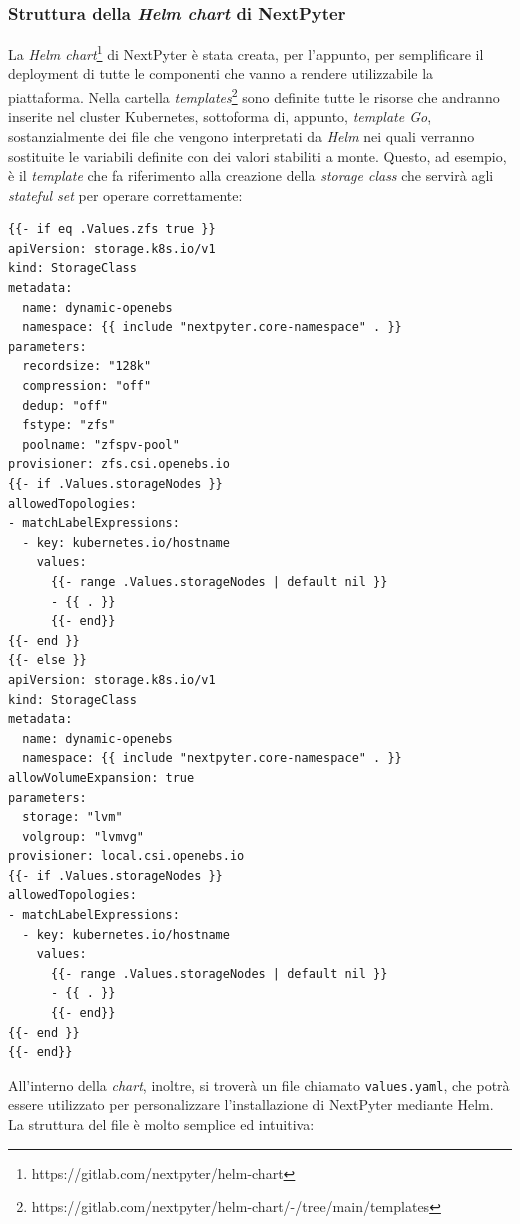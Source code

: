 \subsubsection{Struttura della \textit{Helm chart} di NextPyter}
La \textit{Helm chart}\footnote{https://gitlab.com/nextpyter/helm-chart} di NextPyter è stata creata, per l'appunto, per semplificare il deployment di tutte le componenti che vanno a rendere utilizzabile la piattaforma.
\newline
Nella cartella \textit{templates}\footnote{https://gitlab.com/nextpyter/helm-chart/-/tree/main/templates} sono definite tutte le risorse che andranno inserite nel cluster Kubernetes, sottoforma di, appunto, \textit{template Go}, sostanzialmente dei file che vengono interpretati da \textit{Helm} nei quali verranno sostituite le variabili definite con dei valori stabiliti a monte.
\newline
Questo, ad esempio, è il \textit{template} che fa riferimento alla creazione della \textit{storage class} che servirà agli \textit{stateful set} per operare correttamente:
\newpage
\begin{verbatim}   
{{- if eq .Values.zfs true }}
apiVersion: storage.k8s.io/v1
kind: StorageClass
metadata:
  name: dynamic-openebs
  namespace: {{ include "nextpyter.core-namespace" . }}
parameters:
  recordsize: "128k"
  compression: "off"
  dedup: "off"
  fstype: "zfs"
  poolname: "zfspv-pool"
provisioner: zfs.csi.openebs.io
{{- if .Values.storageNodes }}
allowedTopologies:
- matchLabelExpressions:
  - key: kubernetes.io/hostname
    values: 
      {{- range .Values.storageNodes | default nil }}
      - {{ . }}
      {{- end}}
{{- end }}
{{- else }}
apiVersion: storage.k8s.io/v1
kind: StorageClass
metadata:
  name: dynamic-openebs
  namespace: {{ include "nextpyter.core-namespace" . }}
allowVolumeExpansion: true
parameters:
  storage: "lvm"
  volgroup: "lvmvg"
provisioner: local.csi.openebs.io
{{- if .Values.storageNodes }}
allowedTopologies:
- matchLabelExpressions:
  - key: kubernetes.io/hostname
    values: 
      {{- range .Values.storageNodes | default nil }}
      - {{ . }}
      {{- end}}
{{- end }}
{{- end}}
\end{verbatim}
All'interno della \textit{chart}, inoltre, si troverà un file chiamato \verb|values.yaml|, che potrà essere utilizzato per personalizzare l'installazione di NextPyter mediante Helm.
\newline
La struttura del file è molto semplice ed intuitiva:
